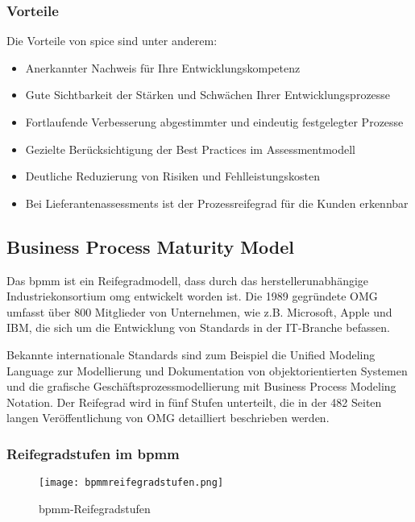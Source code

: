 \subsubsection{Vorteile}

Die Vorteile von \acs{spice} sind unter anderem:

\begin{itemize}
  \item Anerkannter Nachweis für Ihre Entwicklungskompetenz
	\item Gute Sichtbarkeit der Stärken und Schwächen Ihrer Entwicklungsprozesse
	\item Fortlaufende Verbesserung abgestimmter und eindeutig festgelegter Prozesse
	\item Gezielte Berücksichtigung der Best Practices im Assessmentmodell
	\item Deutliche Reduzierung von Risiken und Fehlleistungskosten
	\item Bei Lieferantenassessments ist der Prozessreifegrad für die Kunden erkennbar
\end{itemize}

\subsection{Business Process Maturity Model}

Das \ac{bpmm} ist ein Reifegradmodell, dass durch das herstellerunabhängige Industriekonsortium \ac{omg} entwickelt worden ist.
Die 1989 gegründete OMG umfasst über 800 Mitglieder von Unternehmen, wie z.B. Microsoft, Apple und IBM, die sich um die Entwicklung von Standards in der IT-Branche befassen.\par
Bekannte internationale Standards sind zum Beispiel die Unified Modeling Language zur Modellierung und Dokumentation von objektorientierten Systemen
und die grafische Geschäftsprozessmodellierung mit Business Process Modeling Notation. Der Reifegrad wird in fünf Stufen unterteilt, die in der 482 Seiten langen Veröffentlichung von OMG detailliert beschrieben werden.

\subsubsection{Reifegradstufen im \acs{bpmm}}

\begin{figure}[H]
  \centering
  \caption{\acs{bpmm}-Reifegradstufen}
  \texttt{[image: bpmmreifegradstufen.png]}
  \label{fig:reifegradstufen}
\end{figure}


